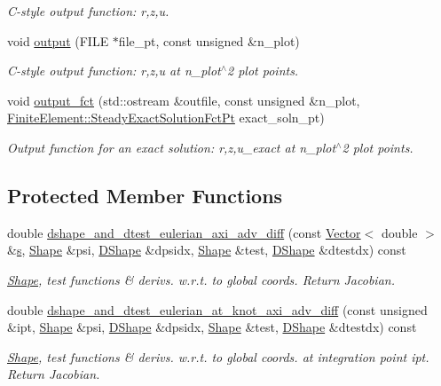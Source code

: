 \begin{DoxyCompactItemize}
\begin{DoxyCompactList}\small\item\em C-\/style output function\+: r,z,u. \end{DoxyCompactList}\item 
void \hyperlink{classoomph_1_1QAxisymAdvectionDiffusionElement_a636e99ae2ec6ac0c5e691acb89c3f5ef}{output} (F\+I\+LE $\ast$file\+\_\+pt, const unsigned \&n\+\_\+plot)
\begin{DoxyCompactList}\small\item\em C-\/style output function\+: r,z,u at n\+\_\+plot$^\wedge$2 plot points. \end{DoxyCompactList}\item 
void \hyperlink{classoomph_1_1QAxisymAdvectionDiffusionElement_a07a6680226c412753604695d77b19467}{output\+\_\+fct} (std\+::ostream \&outfile, const unsigned \&n\+\_\+plot, \hyperlink{classoomph_1_1FiniteElement_a690fd33af26cc3e84f39bba6d5a85202}{Finite\+Element\+::\+Steady\+Exact\+Solution\+Fct\+Pt} exact\+\_\+soln\+\_\+pt)
\begin{DoxyCompactList}\small\item\em Output function for an exact solution\+: r,z,u\+\_\+exact at n\+\_\+plot$^\wedge$2 plot points. \end{DoxyCompactList}\end{DoxyCompactItemize}
\subsection*{Protected Member Functions}
\begin{DoxyCompactItemize}
\item 
double \hyperlink{classoomph_1_1QAxisymAdvectionDiffusionElement_aa940ad09f185dfde0eaeff61bc9c0a31}{dshape\+\_\+and\+\_\+dtest\+\_\+eulerian\+\_\+axi\+\_\+adv\+\_\+diff} (const \hyperlink{classoomph_1_1Vector}{Vector}$<$ double $>$ \&\hyperlink{cfortran_8h_ab7123126e4885ef647dd9c6e3807a21c}{s}, \hyperlink{classoomph_1_1Shape}{Shape} \&psi, \hyperlink{classoomph_1_1DShape}{D\+Shape} \&dpsidx, \hyperlink{classoomph_1_1Shape}{Shape} \&test, \hyperlink{classoomph_1_1DShape}{D\+Shape} \&dtestdx) const
\begin{DoxyCompactList}\small\item\em \hyperlink{classoomph_1_1Shape}{Shape}, test functions \& derivs. w.\+r.\+t. to global coords. Return Jacobian. \end{DoxyCompactList}\item 
double \hyperlink{classoomph_1_1QAxisymAdvectionDiffusionElement_a4bb026009c2c69e6870ff45450382418}{dshape\+\_\+and\+\_\+dtest\+\_\+eulerian\+\_\+at\+\_\+knot\+\_\+axi\+\_\+adv\+\_\+diff} (const unsigned \&ipt, \hyperlink{classoomph_1_1Shape}{Shape} \&psi, \hyperlink{classoomph_1_1DShape}{D\+Shape} \&dpsidx, \hyperlink{classoomph_1_1Shape}{Shape} \&test, \hyperlink{classoomph_1_1DShape}{D\+Shape} \&dtestdx) const
\begin{DoxyCompactList}\small\item\em \hyperlink{classoomph_1_1Shape}{Shape}, test functions \& derivs. w.\+r.\+t. to global coords. at integration point ipt. Return Jacobian. \end{DoxyCompactList}\end{DoxyCompactItemize}
